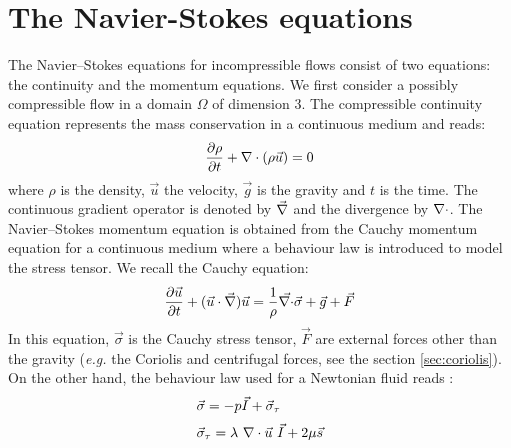 \section{The Navier-Stokes equations}

The Navier--Stokes equations for incompressible flows consist of two equations: the continuity and the momentum equations.
We first consider a possibly compressible flow in a domain $\Omega$ of dimension 3.
The compressible continuity equation represents the mass conservation in a continuous medium and reads:
\begin{equation}\label{eq:ContinuityRef}
  \dfrac{\partial \rho}{\partial t} + \nabla \cdot (\rho \vec{u}) = 0
\end{equation}
where $\rho$ is the density, $\vec{u}$ the velocity, $\vec{g}$ is the gravity and $t$ is the time.
The continuous gradient operator is denoted by $\vec \nabla$ and the divergence by $\nabla \cdot$.
The Navier--Stokes momentum equation is obtained from the Cauchy momentum equation for a continuous medium where a behaviour
law is introduced to model the stress tensor.
We recall the Cauchy equation:
\begin{equation}\label{eq:MomentumRef}
  \dfrac{\partial \vec{u}}{\partial t} + (\vec{u} \cdot \vec \nabla) \vec{u} = \dfrac{1}{\rho}\vec{\nabla \cdot}\vec{\sigma} + \vec{g} + \vec{F}
\end{equation}
In this equation, $\vec{\sigma}$ is the Cauchy stress tensor, $\vec{F}$ are external forces other than the gravity (\textit{e.g.} the Coriolis and centrifugal forces, see the section \ref{sec:coriolis}).
On the other hand, the behaviour law used for a Newtonian fluid reads%
:
\begin{equation}\label{eq:fluidBehaviour}
  \begin{array}{l}
    \vec{\sigma} = -p \vec{I} + \vec{\sigma}_\tau \medskip \\
    \vec{\sigma}_\tau = \lambda~ \Div \vec{u}~ \vec{I} + 2\mu\vec{s}
  \end{array}
\end{equation}
